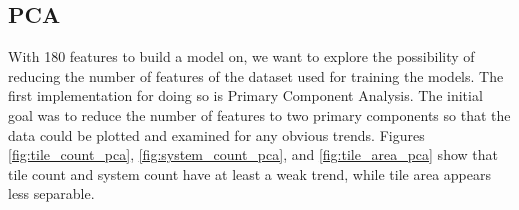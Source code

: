 \documentclass{article}
\begin{document}
	
	\subsection{PCA}
	With 180 features to build a model on, we want to explore the possibility of reducing the number of features of the dataset used for training the models. The first implementation for doing so is Primary Component Analysis. The initial goal was to reduce the number of features to two primary components so that the data could be plotted and examined for any obvious trends. Figures \ref*{fig:tile_count_pca}, \ref*{fig:system_count_pca}, and \ref*{fig:tile_area_pca} show that tile count and system count have at least a weak trend, while tile area appears less separable.
	
	\begin{figure}[H]
		\begin{minipage}{.5\linewidth}
			\centering
		\end{minipage}%
		\begin{minipage}{.5\linewidth}
			\centering

\end{minipage}
\end{figure}
\end{document}
